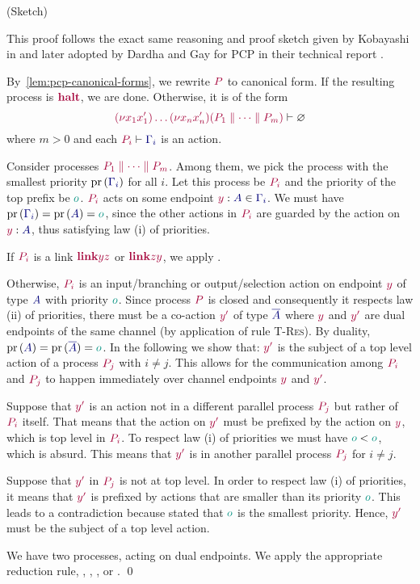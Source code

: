 \proof(Sketch)
\label{prf:thm-pcp-closed-progress}

This proof follows the exact same reasoning and proof sketch given by Kobayashi in \cite{kobayashi06} and later adopted by Dardha and Gay for PCP in their technical report \cite{dardhagay18extended}.

By~\cref{lem:pcp-canonical-forms}, we rewrite $\tm{P}$ to canonical form. If the resulting process is $\tm{\halt}$, we are done. Otherwise, it is of the form
\[
  \seq{\res{x_1}{x'_1}{\dots\res{x_n}{x'_n}{(P_1 \parallel\dots\parallel P_m)}}}{\emptyenv}
\]
where $m>0$ and each $\seq{P_i}{\ty{\Gamma_i}}$ is an action.

Consider processes $\tm {P_1 \parallel\dots\parallel P_m}$. Among them, we pick the process with the smallest priority $\minpr{(\ty{\Gamma_i})}$ for all $i$. Let this process be $\tm{P_i}$ and the priority of the top prefix be $\cs o$. $\tm{P_i}$ acts on some endpoint $\tmty{y}{A}\in\ty{\Gamma_i}$. We must have $\minpr{(\ty{\Gamma_i})}=\pr{(\ty{A})} = \cs o$, since the other actions in $\tm{P_i}$ are guarded by the action on $\tmty{y}{A}$, thus satisfying law (i) of priorities.

If $\tm{P_i}$ is a link $\tm{\link{y}{z}}$ or $\tm{\link{z}{y}}$, we apply .

Otherwise, $\tm{P_i}$ is an input/branching or output/selection action on endpoint $\tm{y}$ of type $\ty{A}$ with priority $\cs{o}$. Since process $\tm{P}$ is closed and consequently it respects law (ii) of priorities, there must be a co-action $\tm{y'}$ of type $\ty{\co{A}}$  where $\tm{y}$ and $\tm{y'}$ are dual endpoints of the same channel (by application of rule \textsc{T-Res}). By duality, $\pr{(\ty{A})}=\pr{(\ty{\co{A}})}= \cs{o}$. In the following we show that: $\tm{y'}$ is the subject of a top level action of a process $\tm{P_j}$ with $i\neq j$. This allows for the communication among $\tm{P_i}$ and $\tm{P_j}$ to happen immediately over channel endpoints $\tm{y}$ and $\tm{y'}$.

Suppose that $\tm{y'}$ is an action not in a different parallel process $\tm{P_j}$ but rather of $\tm{P_i}$ itself. That means that the action on $\tm{y'}$ must be prefixed by the action on $\tm{y}$, which is top level in $\tm{P_i}$. To respect law (i) of priorities we must have $\cs{o}<\cs{o}$, which is absurd. This means that $\tm{y'}$ is in another parallel process $\tm{P_j}$ for $i\neq j$.

Suppose that $\tm{y'}$ in $\tm{P_j}$ is not at top level. In order to respect law (i) of priorities, it means that $\tm{y'}$ is prefixed by actions that are smaller than its priority $\cs{o}$. This leads to a contradiction because stated that $\cs{o}$ is the smallest priority. Hence, $\tm{y'}$ must be the subject of a top level action.

We have two processes, acting on dual endpoints. We apply the appropriate reduction rule, \ie {}, , , or .
\qed

